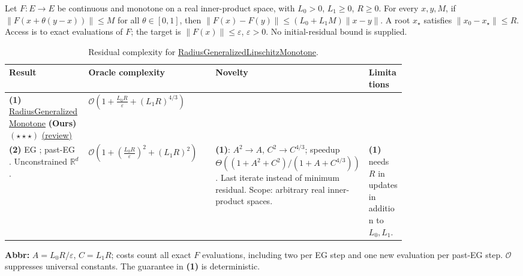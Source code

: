 \begin{table}[tp]
\centering
\caption{Residual complexity for \href{https://github.com/k3nfalt/longtails/blob/main/LongTails/Setups/RadiusGeneralizedLipschitzMonotone.lean}{RadiusGeneralizedLipschitzMonotone}.}\label{tab:RadiusGeneralizedLipschitzMonotone}
\parbox{\linewidth}{\footnotesize Let $F:E\to E$ be continuous and monotone on a real inner-product space, with $L_0>0$, $L_1\ge0$, $R\ge0$. For every $x,y,M$, if $\|F(x+\theta(y-x))\|\le M$ for all $\theta\in[0,1]$, then $\|F(x)-F(y)\|\le(L_0+L_1M)\|x-y\|$. A root $x_\star$ satisfies $\|x_0-x_\star\|\le R$. Access is to exact evaluations of $F$; the target is $\|F(x)\|\le\varepsilon$, $\varepsilon>0$. No initial-residual bound is supplied.}\par\smallskip
\begin{threeparttable}
\footnotesize
\setlength{\tabcolsep}{4pt}\renewcommand{\arraystretch}{1.25}
\begin{tabularx}{\linewidth}{@{}>{\raggedright\arraybackslash}p{0.20\linewidth}>{\raggedright\arraybackslash}p{0.32\linewidth}>{\raggedright\arraybackslash}p{0.25\linewidth}>{\raggedright\arraybackslash}X@{}}
\toprule
\textbf{Result} & \textbf{Oracle complexity} & \textbf{Novelty} & \textbf{Limitations} \\
\midrule
\textbf{(1)} \href{https://github.com/k3nfalt/longtails/blob/main/LongTails/Theorems/RadiusGeneralizedMonotone.lean}{Radius\allowbreak Generalized\allowbreak Monotone} \textbf{(Ours)} $(\star\star\star)$ \href{https://github.com/k3nfalt/longtails/blob/main/scripts/reviews/RadiusGeneralizedMonotone.md}{(review)} & $\mathcal{O}\!\left(1+\frac{L_0R}{\varepsilon}+(L_1R)^{4/3}\right)$ & & \\
\midrule[1.2pt]
\textbf{(2)} EG \citep[Theorem 3.6]{rglmCL2025v1}; past-EG \citep[Corollary 3.3]{rglmGL2026v1}. Unconstrained $\mathbb{R}^d$. & $\mathcal{O}\!\left(1+\left(\frac{L_0R}{\varepsilon}\right)^2+(L_1R)^2\right)$ & \textbf{(1)}: $A^2\to A$, $C^2\to C^{4/3}$; speedup $\Theta((1+A^2+C^2)/(1+A+C^{4/3}))$. Last iterate instead of minimum residual. Scope: arbitrary real inner-product spaces. & \textbf{(1)} needs $R$ in updates in addition to $L_0,L_1$. \\
\bottomrule
\end{tabularx}
\begin{tablenotes}[flushleft]\footnotesize
\item[] \textbf{Abbr:} $A=L_0R/\varepsilon$, $C=L_1R$; costs count all exact $F$ evaluations, including two per EG step and one new evaluation per past-EG step. $\mathcal{O}$ suppresses universal constants. The guarantee in \textbf{(1)} is deterministic.
\end{tablenotes}
\end{threeparttable}
\end{table}
\clearpage
